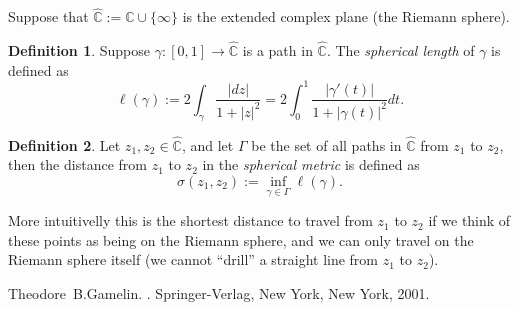 \documentclass[12pt]{article}
\theoremstyle{theorem}
\theoremstyle{definition}
\newtheorem*{defn}{Definition}
\theoremstyle{remark}
\begin{document}
Suppose that $\hat{\mathbb{C}} := {\mathbb{C}} \cup \{ \infty \}$ is the extended complex plane (the Riemann sphere).

\begin{defn}
Suppose $\gamma \colon [0,1] \to \hat{\mathbb{C}}$ is a path in $\hat{\mathbb{C}}$.
The {\em spherical length} of $\gamma$ is defined as
\begin{equation*}
\ell (\gamma) :=
2 \int_\gamma \frac{\lvert dz \rvert}{1+\lvert z \rvert^2}
=
2 \int_0^1 \frac{\lvert \gamma'(t) \rvert}{1+\lvert \gamma(t) \rvert^2} dt.
\end{equation*}
\end{defn}

\begin{defn}
Let $z_1, z_2 \in \hat{\mathbb{C}}$, and let $\Gamma$ be the set of all paths
in $\hat{\mathbb{C}}$ from $z_1$ to $z_2$, then the distance from
$z_1$ to $z_2$ in the {\em spherical metric} is defined as
\begin{equation*}
\sigma(z_1,z_2) := \inf_{\gamma \in \Gamma} \ell(\gamma) .
\end{equation*} 
\end{defn}

More intuitivelly this is the shortest distance to travel from $z_1$ to
$z_2$ if we think of these points as being on the Riemann sphere, and we can
only travel on the Riemann sphere itself (we cannot ``drill'' a straight line
from $z_1$ to $z_2$).

\begin{thebibliography}{9}
Theodore~B.\@ Gamelin.
{\em {}}.
Springer-Verlag, New York, New York, 2001.
\end{thebibliography}
\end{document}
